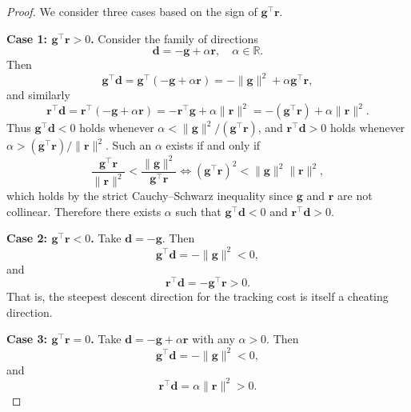 \documentclass[final,1p,times]{elsarticle}
\theoremstyle{plain} %
\theoremstyle{definition} %
\theoremstyle{remark} %
\begin{document}
\begin{proof}
We consider three cases based on the sign of 
$\mathbf{g}^\top\mathbf{r}$.


\medskip\noindent
\textbf{Case 1: $\mathbf{g}^\top \mathbf{r}>0$.}
Consider the family of directions
\begin{equation}\label{eq:family_pos}
\mathbf{d}=-\mathbf{g}+\alpha \mathbf{r}, \quad \alpha\in \mathbb{R}.
\end{equation}
Then
\begin{equation}
\mathbf{g}^\top \mathbf{d}=\mathbf{g}^\top(-\mathbf{g}+\alpha \mathbf{r})=-\|\mathbf{g}\|^2+\alpha \mathbf{g}^\top \mathbf{r},
\end{equation}
and similarly
\begin{equation}
\mathbf{r}^\top \mathbf{d}=\mathbf{r}^\top(-\mathbf{g}+\alpha \mathbf{r})=-\mathbf{r}^\top \mathbf{g}+\alpha\|\mathbf{r}\|^2
=-(\mathbf{g}^\top \mathbf{r})+\alpha\|\mathbf{r}\|^2.
\end{equation}
Thus $\mathbf{g}^\top \mathbf{d}<0$ holds whenever $\alpha<\|\mathbf{g}\|^2/(\mathbf{g}^\top \mathbf{r})$, and $\mathbf{r}^\top \mathbf{d}>0$ holds whenever
$\alpha>(\mathbf{g}^\top \mathbf{r})/\|\mathbf{r}\|^2$. Such an $\alpha$ exists if and only if
\begin{equation}
\frac{\mathbf{g}^\top \mathbf{r}}{\|\mathbf{r}\|^2}<\frac{\|\mathbf{g}\|^2}{\mathbf{g}^\top \mathbf{r}}
\iff (\mathbf{g}^\top \mathbf{r})^2 <\|\mathbf{g}\|^2\|\mathbf{r}\|^2,
\end{equation}
which holds by the strict Cauchy--Schwarz inequality since $\mathbf{g}$ and $\mathbf{r}$ are not collinear.
Therefore there exists $\alpha$ such that $\mathbf{g}^\top \mathbf{d}<0$ and $\mathbf{r}^\top \mathbf{d}>0$.

\medskip\noindent
\textbf{Case 2: $\mathbf{g}^\top \mathbf{r} < 0$.}
Take $\mathbf{d} = -\mathbf{g}$. Then
\begin{equation}
\mathbf{g}^\top\mathbf{d} = -\|\mathbf{g}\|^2 < 0,
\end{equation}
and
\begin{equation}
\mathbf{r}^\top\mathbf{d} = -\mathbf{g}^\top\mathbf{r} > 0.
\end{equation}
That is, the steepest descent direction for the tracking cost is itself
a cheating direction.

\medskip\noindent
\textbf{Case 3: $\mathbf{g}^\top \mathbf{r} = 0$.}
Take $\mathbf{d} = -\mathbf{g} + \alpha\mathbf{r}$ with any $\alpha > 0$. Then
\begin{equation}
\mathbf{g}^\top\mathbf{d} = -\|\mathbf{g}\|^2 < 0,
\end{equation}
and
\begin{equation}
\mathbf{r}^\top\mathbf{d} = \alpha\|\mathbf{r}\|^2 > 0.
\end{equation}





\end{proof}
\end{document}
